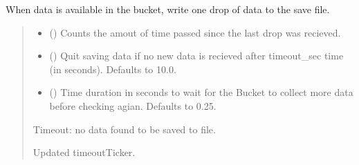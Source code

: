 \documentclass[letterpaper,10pt,english]{sphinxmanual}
\begin{document}
\begin{fulllineitems}
\begin{fulllineitems}
\label{\detokenize{PodApi.Stream:PodApi.Stream.DrainToFile.DrainBucket._DrainDropToFile}}
\pysigstartsignatures
{}
\pysigstopsignatures
\sphinxAtStartPar
When data is available in the bucket, write one drop of data to the save file.
\begin{quote}\begin{description}
\begin{itemize}
\item {} 
\sphinxAtStartPar
{} () \textendash{} Counts the amout of time passed since the last drop was recieved.

\item {} 
\sphinxAtStartPar
{} (\sphinxstyleliteralemphasis{\sphinxupquote{, }}) \textendash{} Quit saving data if no new data is recieved                 after timeout\_sec time (in seconds). Defaults to 10.0.

\item {} 
\sphinxAtStartPar
{} (\sphinxstyleliteralemphasis{\sphinxupquote{, }}) \textendash{} Time duration in seconds to wait for the Bucket to                 collect more data before checking agian. Defaults to 0.25.

\end{itemize}

\sphinxAtStartPar
{} \textendash{} Timeout: no data found to be saved to file.

\sphinxAtStartPar
Updated timeoutTicker.


\end{description}
\end{quote}
\end{fulllineitems}
\end{fulllineitems}
\end{document}
